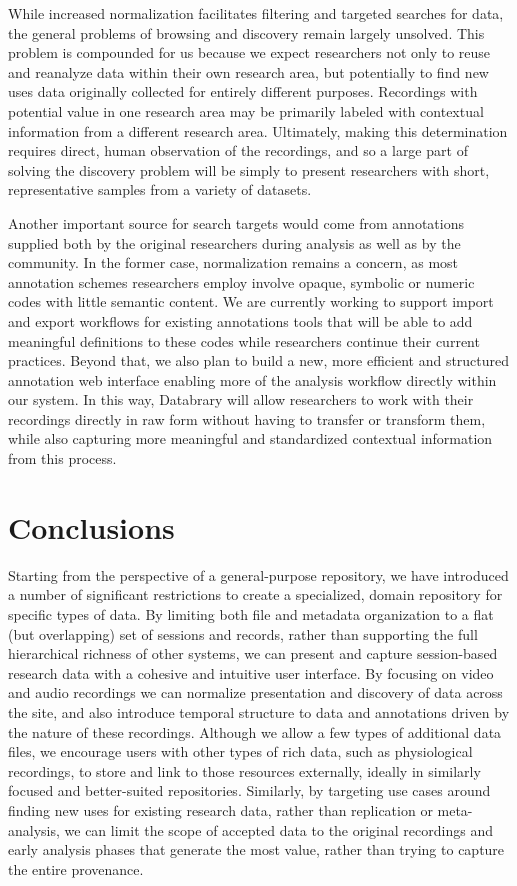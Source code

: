 \documentclass{sig-alternate}
\begin{document}
While increased normalization facilitates filtering and targeted searches for data, the general problems of browsing and discovery remain largely unsolved.
This problem is compounded for us because we expect researchers not only to reuse and reanalyze data within their own research area, but potentially to find new uses data originally collected for entirely different purposes.
Recordings with potential value in one research area may be primarily labeled with contextual information from a different research area.
Ultimately, making this determination requires direct, human observation of the recordings, and so a large part of solving the discovery problem will be simply to present researchers with short, representative samples from a variety of datasets.

Another important source for search targets would come from annotations supplied both by the original researchers during analysis as well as by the community.
In the former case, normalization remains a concern, as most annotation schemes researchers employ involve opaque, symbolic or numeric codes with little semantic content.
We are currently working to support import and export workflows for existing annotations tools that will be able to add meaningful definitions to these codes while researchers continue their current practices.
Beyond that, we also plan to build a new, more efficient and structured annotation web interface enabling more of the analysis workflow directly within our system.
In this way, Databrary will allow researchers to work with their recordings directly in raw form without having to transfer or transform them, while also capturing more meaningful and standardized contextual information from this process.

\section{Conclusions}

Starting from the perspective of a general-purpose repository, we have introduced a number of significant restrictions to create a specialized, domain repository for specific types of data.
By limiting both file and metadata organization to a flat (but overlapping) set of sessions and records, rather than supporting the full hierarchical richness of other systems, we can present and capture session-based research data with a cohesive and intuitive user interface.
By focusing on video and audio recordings we can normalize presentation and discovery of data across the site, and also introduce temporal structure to data and annotations driven by the nature of these recordings.
Although we allow a few types of additional data files, we encourage users with other types of rich data, such as physiological recordings, to store and link to those resources externally, ideally in similarly focused and better-suited repositories.
Similarly, by targeting use cases around finding new uses for existing research data, rather than replication or meta-analysis, we can limit the scope of accepted data to the original recordings and early analysis phases that generate the most value, rather than trying to capture the entire provenance.
\end{document}

